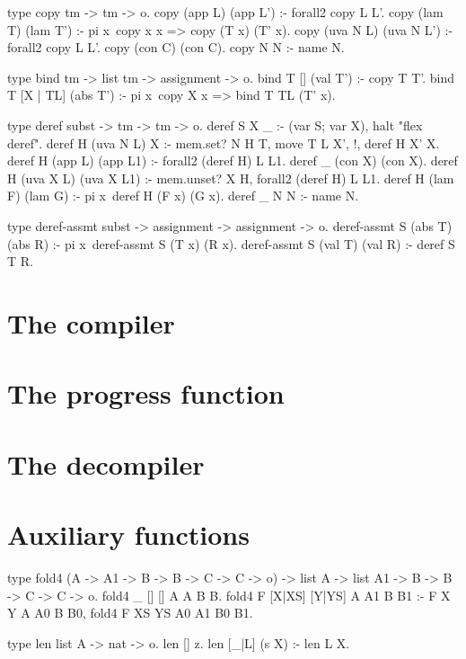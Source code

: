 \begin{elpicode}
  type copy tm -> tm -> o.
  copy (app L)   (app L') :- forall2 copy L L'.
  copy (lam T)   (lam T') :- pi x\ copy x x => copy (T x) (T' x).
  copy (uva N L) (uva N L') :- forall2 copy L L'.
  copy (con C)   (con C).
  copy N N :- name N.

  type bind tm -> list tm -> assignment -> o.
  bind T [] (val T') :- copy T T'.
  bind T [X | TL] (abs T') :- pi x\ copy X x => bind T TL (T' x).

  type deref subst -> tm -> tm -> o.
  deref S X _ :- (var S; var X), halt "flex deref".
  deref H (uva N L)  X         :- mem.set? N H T, 
    move T L X', !, deref H X' X.
  deref H (app L)   (app L1)   :- forall2 (deref H) L L1.
  deref _ (con X)   (con X).
  deref H (uva X L) (uva X L1) :- mem.unset? X H, 
    forall2 (deref H) L L1.
  deref H (lam F)   (lam G)    :- pi x\ deref H (F x) (G x).
  deref _ N         N          :- name N.

  type deref-assmt subst -> assignment -> assignment -> o.
  deref-assmt S (abs T) (abs R) :- pi x\ deref-assmt S (T x) (R x).
  deref-assmt S (val T) (val R) :- deref S T R.
\end{elpicode}

\section{The compiler}

\begin{elpicode}
  
\end{elpicode}

\section{The progress function}

\section{The decompiler}

\section{Auxiliary functions}

\begin{elpicode}
  type fold4 (A -> A1 -> B -> B -> C -> C -> o) -> list A -> list A1 -> B -> B -> C -> C -> o.
  fold4 _ [] [] A A B B.
  fold4 F [X|XS] [Y|YS] A A1 B B1 :- F X Y A A0 B B0, fold4 F XS YS A0 A1 B0 B1.
  
  type len list A -> nat -> o.
  len [] z.
  len [_|L] (s X) :- len L X.
  
  \end{elpicode}
  